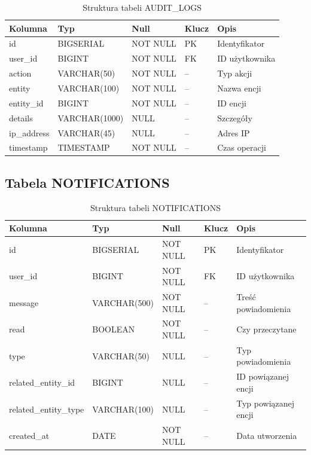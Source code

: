 \documentclass[12pt,a4paper]{report}
\begin{document}
\begin{table}[H]
\centering
\caption{Struktura tabeli AUDIT\_LOGS}
\begin{tabular}{|l|l|l|l|l|}
\hline
\textbf{Kolumna} & \textbf{Typ} & \textbf{Null} & \textbf{Klucz} & \textbf{Opis} \\
\hline
id & BIGSERIAL & NOT NULL & PK & Identyfikator \\
user\_id & BIGINT & NOT NULL & FK & ID użytkownika \\
action & VARCHAR(50) & NOT NULL & -- & Typ akcji \\
entity & VARCHAR(100) & NOT NULL & -- & Nazwa encji \\
entity\_id & BIGINT & NOT NULL & -- & ID encji \\
details & VARCHAR(1000) & NULL & -- & Szczegóły \\
ip\_address & VARCHAR(45) & NULL & -- & Adres IP \\
timestamp & TIMESTAMP & NOT NULL & -- & Czas operacji \\
\hline
\end{tabular}
\end{table}

\subsection{Tabela NOTIFICATIONS}

\begin{table}[H]
\centering
\caption{Struktura tabeli NOTIFICATIONS}
\begin{tabular}{|l|l|l|l|l|}
\hline
\textbf{Kolumna} & \textbf{Typ} & \textbf{Null} & \textbf{Klucz} & \textbf{Opis} \\
\hline
id & BIGSERIAL & NOT NULL & PK & Identyfikator \\
user\_id & BIGINT & NOT NULL & FK & ID użytkownika \\
message & VARCHAR(500) & NOT NULL & -- & Treść powiadomienia \\
read & BOOLEAN & NOT NULL & -- & Czy przeczytane \\
type & VARCHAR(50) & NULL & -- & Typ powiadomienia \\
related\_entity\_id & BIGINT & NULL & -- & ID powiązanej encji \\
related\_entity\_type & VARCHAR(100) & NULL & -- & Typ powiązanej encji \\
created\_at & DATE & NOT NULL & -- & Data utworzenia \\
\hline
\end{tabular}
\end{table}
\end{document}
